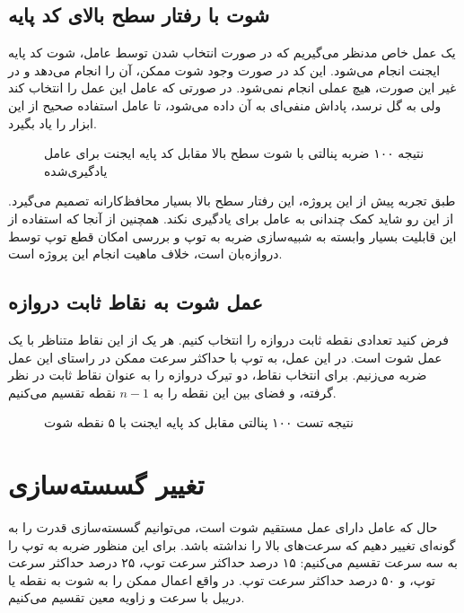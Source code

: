 \subsection{شوت با رفتار سطح بالای کد پایه}
یک عمل خاص مدنظر می‌گیریم که در صورت انتخاب شدن توسط عامل، شوت کد پایه ایجنت
انجام می‌شود. این کد در صورت وجود شوت ممکن، آن را انجام می‌دهد و در غیر این صورت، هیچ عملی انجام نمی‌شود.
در صورتی که عامل این عمل را انتخاب کند ولی به گل نرسد، پاداش منفی‌ای به آن داده می‌شود، تا عامل استفاده صحیح از این ابزار را یاد بگیرد.
\begin{figure}[H]
    \centering
    \caption{نتیجه ۱۰۰ ضربه پنالتی با شوت سطح بالا مقابل کد پایه ایجنت برای عامل یادگیری‌شده}\label{fig:helios_shoot_pie}
\end{figure}

طبق تجربه پیش از این پروژه، این رفتار سطح بالا بسیار محافظ‌کارانه تصمیم می‌گیرد.
از این رو شاید کمک چندانی به عامل برای یادگیری نکند.
همچنین از آنجا که استفاده از این قابلیت بسیار وابسته به شبیه‌سازی ضربه به توپ و بررسی امکان قطع توپ توسط دروازه‌بان است، خلاف ماهیت انجام این پروژه است.
\subsection{عمل شوت به نقاط ثابت دروازه}
فرض کنید تعدادی نقطه ثابت دروازه را انتخاب کنیم.
هر یک از این نقاط متناظر با یک عمل شوت است.
در این عمل، به توپ با حداکثر سرعت ممکن در راستای این عمل ضربه می‌زنیم.
برای انتخاب نقاط، دو تیرک دروازه را به عنوان نقاط ثابت در نظر گرفته، و فضای بین این نقطه را به $n-1$ نقطه تقسیم می‌کنیم.
\begin{figure}[H]
    \centering
    \caption{نتیجه تست ۱۰۰ پنالتی مقابل کد پایه ایجنت با ۵ نقطه شوت}\label{fig:custom_shoot_pie}
\end{figure}

\section{تغییر گسسته‌سازی}
حال که عامل دارای عمل مستقیم شوت است، می‌توانیم گسسته‌سازی قدرت را به گونه‌ای تغییر دهیم که سرعت‌های بالا را نداشته باشد.
برای این منظور ضربه به توپ را به سه سرعت تقسیم می‌کنیم: ۱۵ درصد حداکثر سرعت توپ، ۲۵ درصد حداکثر سرعت توپ، و ۵۰ درصد حداکثر سرعت توپ.
در واقع اعمال ممکن را به شوت به نقطه یا دریبل با سرعت و زاویه معین تقسیم می‌کنیم.

